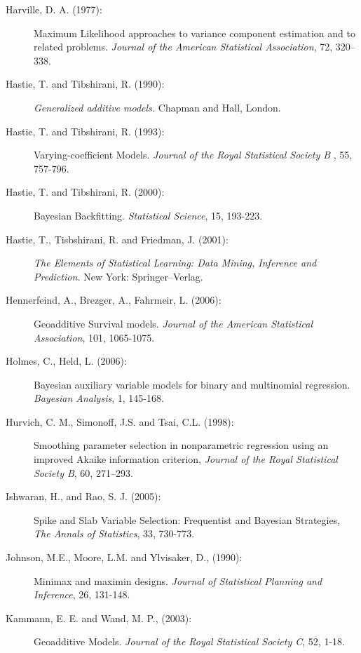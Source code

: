 \documentclass[11pt,a4paper,twoside]{bayesxarticle}
\begin{document}
\begin{description}
\item[Harville, D. A. (1977):]
Maximum Likelihood approaches to variance component estimation and
to related problems. {\it Journal of the American Statistical
Association}, 72, 320--338.

\item[Hastie, T. and Tibshirani, R. (1990):] {\em Generalized additive models.} Chapman and
Hall, London.

\item[Hastie, T. and Tibshirani, R. (1993):] Varying-coefficient Models.
{\em Journal of the Royal Statistical Society B} , 55, 757-796.

\item[Hastie, T. and Tibshirani, R. (2000):] Bayesian Backfitting. {\em Statistical Science}, 15, 193-223.

\item[Hastie, T., Tisbshirani, R. and Friedman, J. (2001):] {\em The Elements of Statistical Learning: Data Mining,
Inference and Prediction.} New York: Springer--Verlag.

\item[Hennerfeind, A., Brezger, A., Fahrmeir, L. (2006):]
Geoadditive Survival models. {\em Journal of the American
Statistical Association}, 101, 1065-1075.

\item[Holmes, C., Held, L. (2006):]
Bayesian auxiliary variable models for binary and multinomial
regression. {\em Bayesian Analysis}, 1, 145-168.

\item[Hurvich, C. M., Simonoff, J.S. and Tsai, C.L. (1998):]
Smoothing parameter selection in nonparametric regression using an
                    improved {A}kaike information criterion,
{\it Journal of the Royal Statistical Society B}, 60, 271--293.

\item[Ishwaran, H., and Rao, S. J. (2005):] Spike and Slab Variable 
Selection: Frequentist and Bayesian Strategies, {\em The Annals of Statistics}, 33, 
730-773.

\item[Johnson, M.E., Moore, L.M. and
Ylvisaker, D., (1990):] Minimax and maximin designs. {\it Journal of
Statistical Planning and Inference}, 26, 131-148.

\item[Kammann, E. E. and Wand, M. P., (2003):] Geoadditive Models. {\it Journal of the Royal
Statistical Society C}, 52, 1-18.


\end{description}
\end{document}
